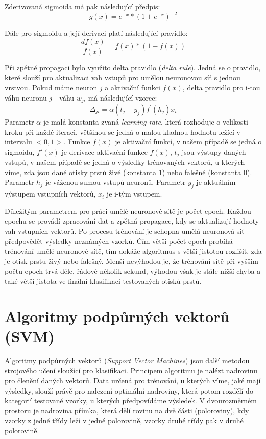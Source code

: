 Zderivovaná sigmoida má pak následující předpis:
$$g(x)=e^{-x}*{(1+e^{-x})}^{-2}$$

Dále pro sigmoidu a její derivaci platí následující pravidlo:
$$\frac{df(x)}{f(x)} = f(x)*(1-f(x))$$

Při zpětné propagaci bylo využito delta pravidlo (\textit{delta rule}). Jedná se o pravidlo, které slouží pro aktualizaci vah vstupů pro umělou neuronovou síť s jednou vrstvou. Pokud máme neuron $j$ a aktivační funkci $f(x)$, delta pravidlo pro i-tou váhu neuronu $j$ - váhu $w_{ji}$ má následující vzorec:
$$\Delta_{ji} = \alpha(t_j - y_j)f^{'}(h_j)x_i$$
Parametr $\alpha$ je malá konstanta zvaná \textit{learning rate}, která rozhoduje o velikosti kroku při každé iteraci, většinou se jedná o malou kladnou hodnotu ležící v intervalu $<0,1>$. \cite{LearningRate} Funkce $f(x)$ je aktivační funkcí, v našem případě se jedná o sigmoidu, $f'(x)$ je derivace aktivační funkce $f(x)$, $t_j$ jsou výstupy daných vstupů, v našem případě se jedná o výsledky trénovaných vektorů, u kterých víme, zda jsou dané otisky prstů živé (konstanta 1) nebo falešné (konstanta 0). Parametr $h_j$ je váženou sumou vstupů neuronů. Parametr $y_j$ je aktuálním výstupem vstupních vektorů, $x_i$ je i-tým vstupem. \cite{DeltaRule}

Důležitým parametrem pro práci umělé neuronové sítě je počet epoch. Každou epochu se provádí zpracování dat a zpětná propagace, kdy se aktualizují hodnoty vah vstupních vektorů. Po procesu trénování je schopna umělá neuronová síť předpovědět výsledky neznámých vzorků. Čím větší počet epoch probíhá trénování umělé neuronové sítě, tím dokáže algoritmus s větší jistotou rozlišit, zda je otisk prstu živý nebo falešný. Menší nevýhodou je, že trénování sítě při vyšším počtu epoch trvá déle, řádově několik sekund, výhodou však je stále nižší chyba a také větší jistota ve finální klasifikaci testovaných otisků prstů.


\section{Algoritmy podpůrných vektorů (SVM)}
Algoritmy podpůrných vektorů (\textit{Support Vector Machines}) jsou další metodou strojového učení sloužící pro klasifikaci. Principem algoritmu je nalézt nadrovinu pro členění daných vektorů. Data určená pro trénování, u kterých víme, jaké mají výsledky, slouží právě pro nalezení optimální nadroviny, která potom rozdělí do kategorií testované vzorky, u kterých předpovídáme výsledek. V dvourozměrném prostoru je nadrovina přímka, která dělí rovinu na dvě části (poloroviny), kdy vzorky z jedné třídy leží v jedné polorovině, vzorky druhé třídy pak v druhé polorovině. 

